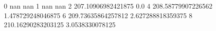 0 nan nan
1 nan nan
2 207.10906982421875 0.0
4 208.58779907226562 1.478729248046875
6 209.73635864257812 2.627288818359375
8 210.16290283203125 3.0538330078125
